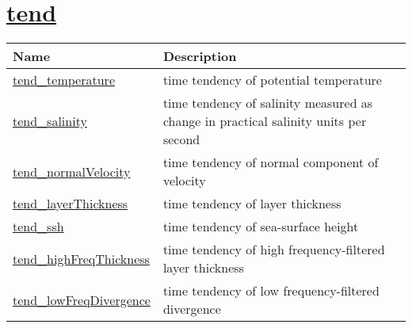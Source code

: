 \section[tend]{\hyperref[sec:var_sec_tend]{tend}}
\label{sec:var_tab_tend}

{\small
\begin{center}
\begin{longtable}{| p{2.0in} | p{4.0in} |}
	\hline
	{\bf Name} & {\bf Description} \\
	\hline
	\hyperref[subsec:var_sec_tend_tend_temperature]{tend\_temperature} & time tendency of potential temperature \\
	\hline
	\hyperref[subsec:var_sec_tend_tend_salinity]{tend\_salinity} & time tendency of salinity measured as change in practical salinity units per second \\
	\hline
	\hyperref[subsec:var_sec_tend_tend_normalVelocity]{tend\_normalVelocity} & time tendency of normal component of velocity \\
	\hline
	\hyperref[subsec:var_sec_tend_tend_layerThickness]{tend\_layerThickness} & time tendency of layer thickness \\
	\hline
	\hyperref[subsec:var_sec_tend_tend_ssh]{tend\_ssh} & time tendency of sea-surface height \\
	\hline
	\hyperref[subsec:var_sec_tend_tend_highFreqThickness]{tend\_highFreqThickness} & time tendency of high frequency-filtered layer thickness \\
	\hline
	\hyperref[subsec:var_sec_tend_tend_lowFreqDivergence]{tend\_lowFreqDivergence} & time tendency of low frequency-filtered divergence \\
	\hline
\end{longtable}
\end{center}
}
